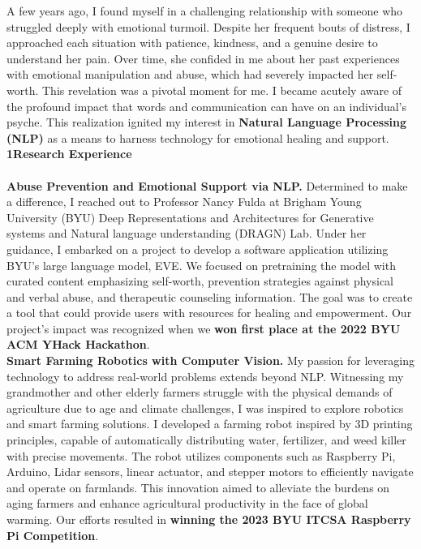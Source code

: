 \documentclass{article}
\begin{document}
A few years ago, I found myself in a challenging relationship with someone who struggled deeply with emotional turmoil. Despite her frequent bouts of distress, I approached each situation with patience, kindness, and a genuine desire to understand her pain. Over time, she confided in me about her past experiences with emotional manipulation and abuse, which had severely impacted her self-worth. This revelation was a pivotal moment for me. I became acutely aware of the profound impact that words and communication can have on an individual’s psyche. This realization ignited my interest in \textbf{Natural Language Processing (NLP)} as a means to harness technology for emotional healing and support.
\\

\Large\textbf{1\hspace{1em}Research Experience}\normalsize
\\
\\
\textbf{Abuse Prevention and Emotional Support via NLP.} Determined to make a difference, I reached out to Professor Nancy Fulda at Brigham Young University (BYU) Deep Representations and Architectures for Generative systems and Natural language understanding (DRAGN) Lab. Under her guidance, I embarked on a project to develop a software application utilizing BYU's large language model, EVE. We focused on pretraining the model with curated content emphasizing self-worth, prevention strategies against physical and verbal abuse, and therapeutic counseling information. The goal was to create a tool that could provide users with resources for healing and empowerment. Our project's impact was recognized when we \textbf{won first place at the 2022 BYU ACM YHack Hackathon}.
\\

\textbf{Smart Farming Robotics with Computer Vision.} My passion for leveraging technology to address real-world problems extends beyond NLP. Witnessing my grandmother and other elderly farmers struggle with the physical demands of agriculture due to age and climate challenges, I was inspired to explore robotics and smart farming solutions. I developed a farming robot inspired by 3D printing principles, capable of automatically distributing water, fertilizer, and weed killer with precise movements. The robot utilizes components such as Raspberry Pi, Arduino, Lidar sensors, linear actuator, and stepper motors to efficiently navigate and operate on farmlands. This innovation aimed to alleviate the burdens on aging farmers and enhance agricultural productivity in the face of global warming. Our efforts resulted in \textbf{winning the 2023 BYU ITCSA Raspberry Pi Competition}.
\\
\end{document}
